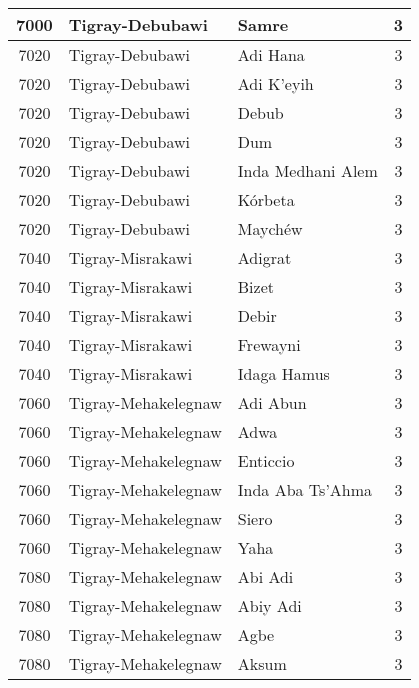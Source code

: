 \documentclass[12pt,a4paper]{report}
\begin{document}
\begin{tabular}{|c|l|l|c|}
\hline 
\rule[-1ex]{0pt}{2.5ex} 7000 & Tigray-Debubawi & Samre & 3 \\
\hline 
\rule[-1ex]{0pt}{2.5ex} 7020 & Tigray-Debubawi & Adi Hana & 3 \\
\hline 
\rule[-1ex]{0pt}{2.5ex} 7020 & Tigray-Debubawi & Adi K'eyih & 3 \\
\hline 
\rule[-1ex]{0pt}{2.5ex} 7020 & Tigray-Debubawi & Debub & 3 \\
\hline 
\rule[-1ex]{0pt}{2.5ex} 7020 & Tigray-Debubawi & Dum & 3 \\
\hline 
\rule[-1ex]{0pt}{2.5ex} 7020 & Tigray-Debubawi & Inda Medhani Alem & 3 \\
\hline 
\rule[-1ex]{0pt}{2.5ex} 7020 & Tigray-Debubawi & K\'orbeta & 3 \\
\hline 
\rule[-1ex]{0pt}{2.5ex} 7020 & Tigray-Debubawi & Maych\'ew & 3 \\
\hline 
\rule[-1ex]{0pt}{2.5ex} 7040 & Tigray-Misrakawi & Adigrat & 3 \\
\hline 
\rule[-1ex]{0pt}{2.5ex} 7040 & Tigray-Misrakawi & Bizet & 3 \\
\hline 
\rule[-1ex]{0pt}{2.5ex} 7040 & Tigray-Misrakawi & Debir & 3 \\
\hline 
\rule[-1ex]{0pt}{2.5ex} 7040 & Tigray-Misrakawi & Frewayni & 3 \\
\hline 
\rule[-1ex]{0pt}{2.5ex} 7040 & Tigray-Misrakawi & Idaga Hamus & 3 \\
\hline 
\rule[-1ex]{0pt}{2.5ex} 7060 & Tigray-Mehakelegnaw & Adi Abun & 3 \\
\hline 
\rule[-1ex]{0pt}{2.5ex} 7060 & Tigray-Mehakelegnaw & Adwa & 3 \\
\hline 
\rule[-1ex]{0pt}{2.5ex} 7060 & Tigray-Mehakelegnaw & Enticcio & 3 \\
\hline 
\rule[-1ex]{0pt}{2.5ex} 7060 & Tigray-Mehakelegnaw & Inda Aba Ts'Ahma & 3 \\
\hline 
\rule[-1ex]{0pt}{2.5ex} 7060 & Tigray-Mehakelegnaw & Siero & 3 \\
\hline 
\rule[-1ex]{0pt}{2.5ex} 7060 & Tigray-Mehakelegnaw & Yaha & 3 \\
\hline 
\rule[-1ex]{0pt}{2.5ex} 7080 & Tigray-Mehakelegnaw & Abi Adi & 3 \\
\hline 
\rule[-1ex]{0pt}{2.5ex} 7080 & Tigray-Mehakelegnaw & Abiy Adi & 3 \\
\hline 
\rule[-1ex]{0pt}{2.5ex} 7080 & Tigray-Mehakelegnaw & Agbe & 3 \\
\hline 
\rule[-1ex]{0pt}{2.5ex} 7080 & Tigray-Mehakelegnaw & Aksum & 3 \\

\end{tabular}
\end{document}
